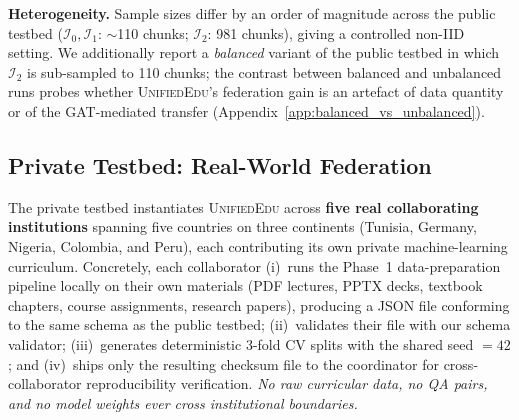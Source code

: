 \documentclass[11pt]{article}
\theoremstyle{plain}
\theoremstyle{definition}
\theoremstyle{remark}
\newcommand{\UniEdu}{\textsc{UnifiedEdu}}
\begin{document}
\textbf{Heterogeneity.} Sample sizes differ by an order
of magnitude across the public testbed
($\mathcal{I}_0,\mathcal{I}_1$: $\sim$110 chunks;
$\mathcal{I}_2$: 981 chunks), giving a controlled
non-IID setting. We additionally report a
\emph{balanced} variant of the public testbed in which
$\mathcal{I}_2$ is sub-sampled to 110 chunks; the
contrast between balanced and unbalanced runs probes
whether \UniEdu{}'s federation gain is an artefact of
data quantity or of the GAT-mediated transfer
(Appendix~\ref{app:balanced_vs_unbalanced}).

\subsection{Private Testbed: Real-World Federation}
\label{sec:private_testbed}

The private testbed instantiates \UniEdu{} across
\textbf{five real collaborating institutions}
spanning five countries on three continents
(Tunisia, Germany, Nigeria, Colombia, and Peru),
each contributing its own private machine-learning
curriculum. Concretely, each collaborator
(i)~runs the Phase~1 data-preparation pipeline locally
on their own materials (PDF lectures, PPTX decks,
textbook chapters, course assignments, research
papers), producing a JSON file conforming to the
same schema as the public testbed; (ii)~validates
their file with our schema validator;
(iii)~generates deterministic 3-fold CV splits with
the shared seed $=42$; and (iv)~ships only the
resulting checksum file to the coordinator for
cross-collaborator reproducibility verification.
\emph{No raw curricular data, no QA pairs, and no
model weights ever cross institutional boundaries.}
\end{document}

